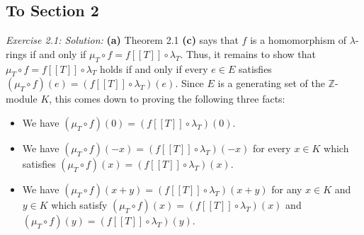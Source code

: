 \documentclass[numbers=enddot,12pt,final,onecolumn,notitlepage]{scrartcl}%
\begin{document}
\subsection{To Section 2}

\textit{Exercise 2.1: Solution:} \textbf{(a)} Theorem 2.1 \textbf{(c)} says
that $f$ is a homomorphism of $\lambda$-rings if and only if $\mu_{T}\circ
f=f\left[  \left[  T\right]  \right]  \circ\lambda_{T}$. Thus, it remains to
show that $\mu_{T}\circ f=f\left[  \left[  T\right]  \right]  \circ\lambda
_{T}$ holds if and only if every $e\in E$ satisfies $\left(  \mu_{T}\circ
f\right)  \left(  e\right)  =\left(  f\left[  \left[  T\right]  \right]
\circ\lambda_{T}\right)  \left(  e\right)  $. Since $E$ is a generating set of
the $\mathbb{Z}$-module $K$, this comes down to proving the following three facts:

\begin{itemize}
\item We have $\left(  \mu_{T}\circ f\right)  \left(  0\right)  =\left(
f\left[  \left[  T\right]  \right]  \circ\lambda_{T}\right)  \left(  0\right)
$.

\item We have $\left(  \mu_{T}\circ f\right)  \left(  -x\right)  =\left(
f\left[  \left[  T\right]  \right]  \circ\lambda_{T}\right)  \left(
-x\right)  $ for every $x\in K$ which satisfies $\left(  \mu_{T}\circ
f\right)  \left(  x\right)  =\left(  f\left[  \left[  T\right]  \right]
\circ\lambda_{T}\right)  \left(  x\right)  $.

\item We have $\left(  \mu_{T}\circ f\right)  \left(  x+y\right)  =\left(
f\left[  \left[  T\right]  \right]  \circ\lambda_{T}\right)  \left(
x+y\right)  $ for any $x\in K$ and $y\in K$ which satisfy $\left(  \mu
_{T}\circ f\right)  \left(  x\right)  =\left(  f\left[  \left[  T\right]
\right]  \circ\lambda_{T}\right)  \left(  x\right)  $ and $\left(  \mu
_{T}\circ f\right)  \left(  y\right)  =\left(  f\left[  \left[  T\right]
\right]  \circ\lambda_{T}\right)  \left(  y\right)  $.
\end{itemize}
\end{document}
